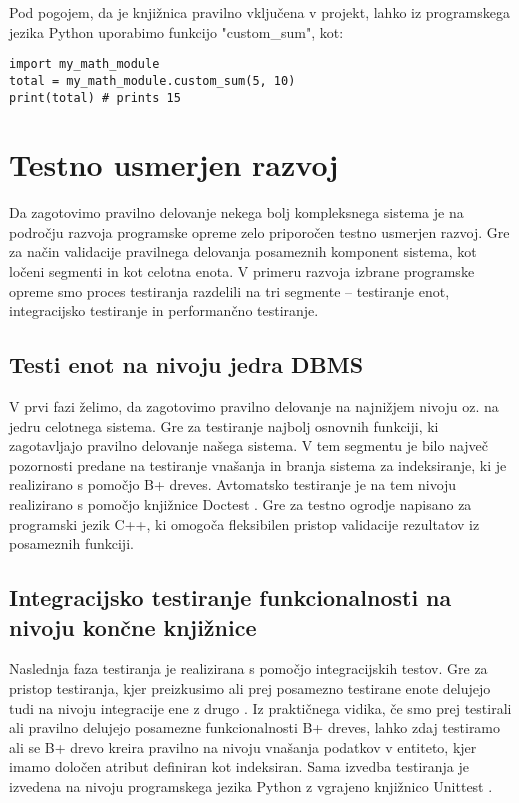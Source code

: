 \documentclass[a4paper,12pt,openright]{book}
\begin{document}
    \noindent
    Pod pogojem, da je knjižnica pravilno vključena v projekt, lahko iz programskega jezika Python uporabimo funkcijo "custom\_sum", kot:
\begin{verbatim}
import my_math_module
total = my_math_module.custom_sum(5, 10)
print(total) # prints 15
\end{verbatim}
    
    \newpage
    \section{Testno usmerjen razvoj}

    Da zagotovimo pravilno delovanje nekega bolj kompleksnega sistema je na področju razvoja programske opreme zelo priporočen testno usmerjen razvoj. Gre za način validacije pravilnega delovanja posameznih komponent sistema, kot ločeni segmenti in kot celotna enota. V primeru razvoja izbrane programske opreme smo proces testiranja razdelili na tri segmente – testiranje enot, integracijsko testiranje in performančno testiranje.
   
   \subsection{Testi enot na nivoju jedra DBMS}

    V prvi fazi želimo, da zagotovimo pravilno delovanje na najnižjem nivoju oz. na jedru celotnega sistema. Gre za testiranje najbolj osnovnih funkciji, ki zagotavljajo pravilno delovanje našega sistema. V tem segmentu je bilo največ pozornosti predane na testiranje vnašanja in branja sistema za indeksiranje, ki je realizirano s pomočjo B+ dreves. Avtomatsko testiranje je na tem nivoju realizirano s pomočjo knjižnice Doctest \cite{DOCTEST_GITHUB}. Gre za testno ogrodje napisano za programski jezik C++, ki omogoča fleksibilen pristop validacije rezultatov iz posameznih funkciji.
   
   \subsection{Integracijsko testiranje funkcionalnosti na nivoju končne knjižnice}

    Naslednja faza testiranja je realizirana s pomočjo integracijskih testov. Gre za pristop testiranja, kjer preizkusimo ali prej posamezno testirane enote delujejo tudi na nivoju integracije ene z drugo \cite{brar2015differentiating}. Iz praktičnega vidika, če smo prej testirali ali pravilno delujejo posamezne funkcionalnosti B+ dreves, lahko zdaj testiramo ali se B+ drevo kreira pravilno na nivoju vnašanja podatkov v entiteto, kjer imamo določen atribut definiran kot indeksiran. Sama izvedba testiranja je izvedena na nivoju programskega jezika Python z vgrajeno knjižnico Unittest \cite{PY_UNITTEST}.
   
\end{document}
